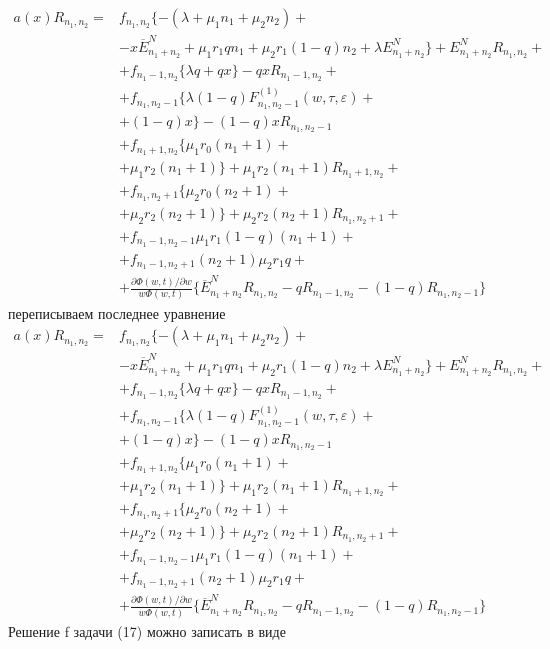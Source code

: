  \begin{equation}
	\begin{split}
		a(x)R_{n_{1}, n_{2}}=
		&f_{n_{1}, n_{2}}\{-(\lambda+\mu_{1}n_{1}+\mu_{2}n_{2}) +\\
		&-x\overline{E}_{n_{1}+n_{2}}^N+\mu_{1}r_{1}q n_{1}+ \mu_{2}r_{1}(1-q)n_{2}+ \lambda E_{n_{1}+n_{2}}^N\} + E_{n_{1}+n_{2}}^NR_{n_{1}, n_{2}} +\\
		&+f_{n_{1}-1, n_{2}}\{\lambda q+ q  x\}-q xR_{n_{1}-1, n_{2}}+\\
		&+ f_{n_{1}, n_{2}-1}\{\lambda (1-q)F_{n_{1}, n_{2}-1}^{(1)}(w,\tau,\varepsilon) +\\
		&+ (1-q) x\} -(1-q) xR_{n_{1}, n_{2}-1} \\
		&+  f_{n_{1}+1, n_{2}}\{\mu_{1} r_{0}(n_{1}+1)+\\
		& + \mu_{1} r_{2}(n_{1}+1)\}+\mu_{1} r_{2}(n_{1}+1)R_{n_{1}+1, n_{2}}+\\
		&+ f_{n_{1}, n_{2}+1}\{\mu_{2} r_{0}(n_{2}+1)+\\
		& + \mu_{2} r_{2} (n_{2}+1)\} +\mu_{2} r_{2} (n_{2}+1)R_{n_{1}, n_{2}+1}+\\
		&+f_{n_{1}-1, n_{2}-1}\mu_{1} r_{1}(1-q)(n_{1}+1) +\\
		&+ f_{n_{1}-1, n_{2}+1}(n_{2}+1)\mu_{2} r_{1}q  +\\
		&+ \frac{\partial\Phi(w,t)/\partial w}{w\Phi(w,t)}\{ \overline{E}_{n_{1}+n_{2}}^NR_{n_{1}, n_{2}}-   q R_{n_{1}-1, n_{2}}- (1-q) R_{n_{1}, n_{2}-1}\}
	\end{split}
\end{equation}
переписываем последнее уравнение
 \begin{equation}
	\begin{split}
		a(x)R_{n_{1}, n_{2}}=
		&f_{n_{1}, n_{2}}\{-(\lambda+\mu_{1}n_{1}+\mu_{2}n_{2}) +\\
		&-x\overline{E}_{n_{1}+n_{2}}^N+\mu_{1}r_{1}q n_{1}+ \mu_{2}r_{1}(1-q)n_{2}+ \lambda E_{n_{1}+n_{2}}^N\} + E_{n_{1}+n_{2}}^NR_{n_{1}, n_{2}} +\\
		&+f_{n_{1}-1, n_{2}}\{\lambda q+ q  x\}-q xR_{n_{1}-1, n_{2}}+\\
		&+ f_{n_{1}, n_{2}-1}\{\lambda (1-q)F_{n_{1}, n_{2}-1}^{(1)}(w,\tau,\varepsilon) +\\
		&+ (1-q) x\} -(1-q) xR_{n_{1}, n_{2}-1} \\
		&+  f_{n_{1}+1, n_{2}}\{\mu_{1} r_{0}(n_{1}+1)+\\
		& + \mu_{1} r_{2}(n_{1}+1)\}+\mu_{1} r_{2}(n_{1}+1)R_{n_{1}+1, n_{2}}+\\
		&+ f_{n_{1}, n_{2}+1}\{\mu_{2} r_{0}(n_{2}+1)+\\
		& + \mu_{2} r_{2} (n_{2}+1)\} +\mu_{2} r_{2} (n_{2}+1)R_{n_{1}, n_{2}+1}+\\
		&+f_{n_{1}-1, n_{2}-1}\mu_{1} r_{1}(1-q)(n_{1}+1) +\\
		&+ f_{n_{1}-1, n_{2}+1}(n_{2}+1)\mu_{2} r_{1}q  +\\
		&+ \frac{\partial\Phi(w,t)/\partial w}{w\Phi(w,t)}\{ \overline{E}_{n_{1}+n_{2}}^NR_{n_{1}, n_{2}}-   q R_{n_{1}-1, n_{2}}- (1-q) R_{n_{1}, n_{2}-1}\}
	\end{split}
\end{equation}
Решение f задачи (17) можно записать в виде

